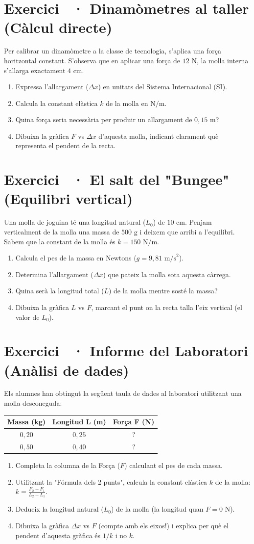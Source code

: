 \documentclass[12pt,a4paper,twoside]{article}
\newcounter{exercici}
\newcommand{\exercici}[1]{%
  \stepcounter{exercici}
  \section*{Exercici \theexercici\ \textnormal{· #1}}
  \vspace{-10pt}
}
\begin{document}
\exercici{Dinamòmetres al taller (Càlcul directe)}
Per calibrar un dinamòmetre a la classe de tecnologia, s'aplica una força horitzontal constant. S'observa que en aplicar una força de $12\text{ N}$, la molla interna s'allarga exactament $4\text{ cm}$.
\begin{enumerate}[label=\textbf{\alph*)}]
  \item Expressa l'allargament ($\Delta x$) en unitats del Sistema Internacional (SI).
  \item Calcula la constant elàstica $k$ de la molla en $\text{N/m}$.
  \item Quina força seria necessària per produir un allargament de $0{,}15\text{ m}$?
  \item Dibuixa la gràfica $F$ vs $\Delta x$ d'aquesta molla, indicant clarament què representa el pendent de la recta.
\end{enumerate}

\exercici{El salt del "Bungee" (Equilibri vertical)}
Una molla de joguina té una longitud natural ($L_0$) de $10\text{ cm}$. Penjam verticalment de la molla una massa de $500\text{ g}$ i deixem que arribi a l'equilibri. Sabem que la constant de la molla és $k = 150\text{ N/m}$.
\begin{enumerate}[label=\textbf{\alph*)}]
  \item Calcula el pes de la massa en Newtons ($g = 9{,}81\text{ m/s}^2$).
  \item Determina l'allargament ($\Delta x$) que pateix la molla sota aquesta càrrega.
  \item Quina serà la longitud total ($L$) de la molla mentre sosté la massa?
  \item Dibuixa la gràfica $L$ vs $F$, marcant el punt on la recta talla l'eix vertical (el valor de $L_0$).
\end{enumerate}

\vspace{0.5cm}
\exercici{Informe del Laboratori (Anàlisi de dades)}
Els alumnes han obtingut la següent taula de dades al laboratori utilitzant una molla desconeguda:
\begin{center}
\begin{tabular}{|c|c|c|}
\hline
\textbf{Massa (kg)} & \textbf{Longitud L (m)} & \textbf{Força F (N)} \\
\hline
$0{,}20$ & $0{,}25$ & ? \\
$0{,}50$ & $0{,}40$ & ? \\
\hline
\end{tabular}
\end{center}
\begin{enumerate}[label=\textbf{\alph*)}]
  \item Completa la columna de la Força ($F$) calculant el pes de cada massa.
  \item Utilitzant la "Fórmula dels 2 punts", calcula la constant elàstica $k$ de la molla: $k = \frac{F_2 - F_1}{L_2 - L_1}$.
  \item Dedueix la longitud natural ($L_0$) de la molla (la longitud quan $F = 0\text{ N}$).
  \item Dibuixa la gràfica $\Delta x$ vs $F$ (compte amb els eixos!) i explica per què el pendent d'aquesta gràfica és $1/k$ i no $k$.
\end{enumerate}
\end{document}
